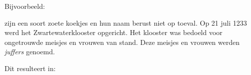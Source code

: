 Bijvoorbeeld:

\startbuffer
{}

 zijn een soort zoete
koekjes en hun naam berust niet op toeval. Op 21 juli 1233
werd het Zwartewaterklooster opgericht. Het klooster was
bedoeld voor ongetrouwde meisjes en vrouwen van stand. Deze
meisjes en vrouwen werden {\em juffers} genoemd. \stopstars
\stopbuffer

\typebuffer

Dit resulteert in:

\haalbuffer

\stoponderdeel
